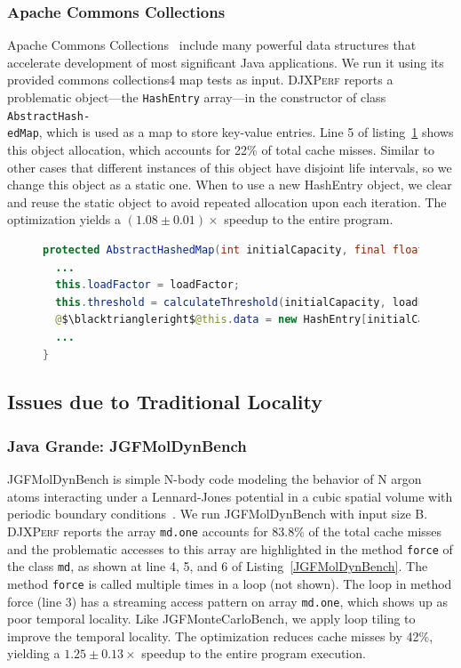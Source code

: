 \documentclass[sigconf,10pt,review,anonymous]{acmart}\settopmatter{printfolios=true,printccs=false,printacmref=false}
\newcommand{\tool}[0]{\mbox{\textsc{DJXPerf}}}
\begin{document}
\subsubsection{Apache Commons Collections}
Apache Commons Collections~\cite{Commons} include many powerful data structures that accelerate development of most significant Java applications. We run it using its provided commons collections4 map tests as input.
 \tool{} reports a problematic object---the {\tt HashEntry} array---in the constructor of class {\tt AbstractHash-\\edMap}, which is used as a map to store key-value entries. Line 5 of listing~\ref{Commons} shows this object allocation, which accounts for 22\% of total cache misses. 
Similar to other cases that different instances of this object have disjoint life intervals, so we change this object as a static one. When to use a new HashEntry object, we clear and reuse the static object to avoid repeated allocation upon each iteration. The optimization yields a $(1.08\pm0.01)\times$ speedup to the entire program. %

\begin{figure}
\begin{lstlisting}[firstnumber=1,language=java]
protected AbstractHashedMap(int initialCapacity, final float loadFactor) {
  ...
  this.loadFactor = loadFactor;
  this.threshold = calculateThreshold(initialCapacity, loadFactor);
  @$\blacktriangleright$@this.data = new HashEntry[initialCapacity];
  ...
}
\end{lstlisting}
\vspace{-0.3in}
\label{Commons}
\end{figure}


\subsection{Issues due to Traditional Locality}
\subsubsection{Java Grande: JGFMolDynBench}

JGFMolDynBench is simple N-body code modeling the behavior of N argon atoms interacting under a Lennard-Jones potential in a cubic spatial volume with periodic boundary conditions~\cite{grande}.
We run JGFMolDynBench with input size B. \tool{} reports the array {\tt md.one} accounts for 83.8\% of the total cache misses and the problematic accesses to this array are highlighted in the method {\tt force} of the class {\tt md}, as shown at line 4, 5, and 6 of Listing~\ref{JGFMolDynBench}. 
The method {\tt force} is called multiple times in a loop (not shown). The loop in method force (line 3) has a streaming access pattern on array {\tt md.one}, which shows up as poor temporal locality. Like JGFMonteCarloBench, we apply loop tiling to improve the temporal locality. The optimization reduces cache misses by 42\%, yielding a $1.25\pm0.13\times$ speedup to the entire program execution.
\end{document}
